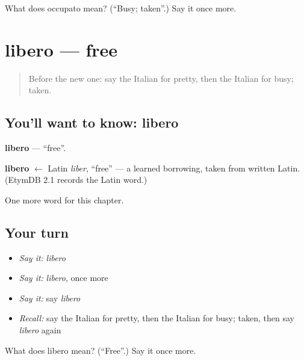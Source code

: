 \begin{tcolorbox}[breakable,colback=teal!4,colframe=teal!35!black,title={Before you move on}]
What does occupato mean? (\textquotedblleft{}Busy; taken\textquotedblright{}.) Say it once more.
\end{tcolorbox}
\section[libero]{libero — free}

\label{lesson:IT-C124-libero}



\begin{quote}
Before the new one: say the Italian for pretty, then the Italian for busy; taken.
\end{quote}

\subsection*{You'll want to know: libero}
\textbf{libero} — \textquotedblleft{}free\textquotedblright{}.

\begin{cousinweb}
\textbf{libero} $\leftarrow$ Latin \emph{liber}, \textquotedblleft{}free\textquotedblright{} — a learned borrowing, taken from written Latin. (EtymDB 2.1 records the Latin word.)
\end{cousinweb}

\begin{grammarlens}[title={What you've built}]
One more word for this chapter.
\end{grammarlens}

\subsection*{Your turn}
\begin{itemize}
\raggedright
  \item \emph{Say it:} \emph{libero}
  \item \emph{Say it:} \emph{libero}, once more
  \item \emph{Say it:} say \emph{libero}
  \item \emph{Recall:} say the Italian for pretty, then the Italian for busy; taken, then say \emph{libero} again
\end{itemize}

\begin{tcolorbox}[breakable,colback=teal!4,colframe=teal!35!black,title={Before you move on}]
What does libero mean? (\textquotedblleft{}Free\textquotedblright{}.) Say it once more.
\end{tcolorbox}
